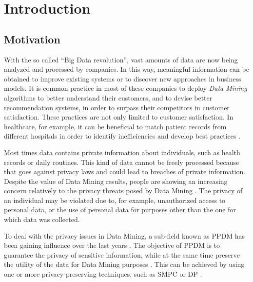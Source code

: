 %

\acresetall

\chapter{Introduction}
\label{ch:Introduction}


\section{Motivation}
\label{sec:Intro_Motivation}

With the so called ``Big Data revolution'', vast amounts of data are now being analyzed and processed by companies. In this way, meaningful information can be obtained to improve existing systems or to discover new approaches in business models. It is common practice in most of these companies to deploy \textit{Data Mining} algorithms to better understand their customers, and to devise better recommendation systems, in order to surpass their competitors in customer satisfaction.
These practices are not only limited to customer satisfaction. In healthcare, for example, it can be beneficial to match patient records from different hospitals in order to identify inefficiencies and develop best practices \cite{Lu2014}.

Most times data contains private information about individuals, such as health records or daily routines. This kind of data cannot be freely processed because that goes against privacy laws and could lead to breaches of private information.
Despite the value of Data Mining results, people are showing an increasing concern relatively to the privacy threats posed by Data Mining \cite{brankovic1999privacy}. The privacy of an individual may be violated due to, for example, unauthorized access to personal data, or the use of personal data for purposes other than the one for which data was collected.

To deal with the privacy issues in Data Mining, a sub-field known as \ac{PPDM} has been gaining influence over the last years \cite{DAcquisto2015}. The objective of PPDM is to guarantee the privacy of sensitive information, while at the same time preserve the utility of the data for Data Mining purposes \cite{agrawal2000privacy}.
This can be achieved by using one or more privacy-preserving techniques, such as \ac{SMPC} \cite{DAcquisto2015} or \ac{DP} \cite{Danezis2015}.


